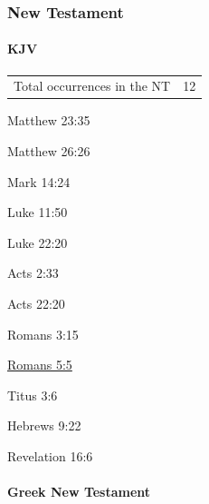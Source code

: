 	\subsubsection{New Testament} %
		\label{SHED-NT}
	
		\paragraph{KJV}
			\label{SHED-NT-KJV}
			
	
			\begin{tabular}{ll}
				Total occurrences in the NT & 12
			\end{tabular}
			
			\begin{compactdesc}
				\item[Matthew 23:35]
				\item[Matthew 26:26]
				\item[Mark 14:24]
				\item[Luke 11:50] 
				\item[Luke 22:20] 
				\item[Acts 2:33]
				\item[Acts 22:20]
				\item[Romans 3:15]
				\item[{\hyperref[ROMANS-5-5]{Romans 5:5}}]
				\item[Titus 3:6]
				\item[Hebrews 9:22]
				\item[Revelation 16:6]
			\end{compactdesc}
			
		\paragraph{Greek New Testament} %
			\label{SHED-GREEK}
		
			\subparagraph{\texorpdfstring{}{}}
				\label{EKCHEO}
			
